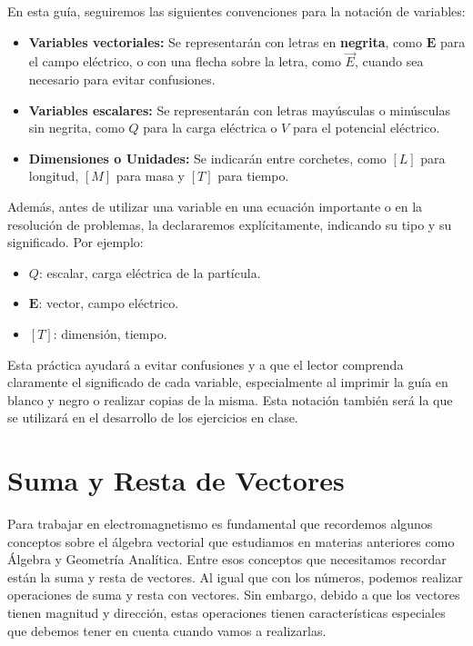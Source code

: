 \documentclass{book}
\begin{document}
En esta guía, seguiremos las siguientes convenciones para la notación de variables:

\begin{itemize}
    \item[\textbullet] \textbf{Variables vectoriales:} Se representarán con letras en \textbf{negrita}, como $\mathbf{E}$ para el campo eléctrico, o con una flecha sobre la letra, como $\vec{E}$, cuando sea necesario para evitar confusiones.
    \item[\textbullet] \textbf{Variables escalares:} Se representarán con letras mayúsculas o minúsculas sin negrita, como $Q$ para la carga eléctrica o $V$ para el potencial eléctrico.
    \item[\textbullet] \textbf{Dimensiones o Unidades:} Se indicarán entre corchetes, como $[L]$ para longitud, $[M]$ para masa y $[T]$ para tiempo.
\end{itemize}
Además, antes de utilizar una variable en una ecuación importante o en la resolución de problemas, la declararemos explícitamente, indicando su tipo y su significado. Por ejemplo:

\begin{itemize}
    \item[\textbullet] $Q$: escalar, carga eléctrica de la partícula.
    \item[\textbullet] $\mathbf{E}$: vector, campo eléctrico.
    \item[\textbullet] $[T]$: dimensión, tiempo.
\end{itemize}

Esta práctica ayudará a evitar confusiones y a que el lector comprenda claramente el significado de cada variable, especialmente al imprimir la guía en blanco y negro o realizar copias de la misma. Esta notación también será la que se utilizará en el desarrollo de los ejercicios en clase.

\section{Suma y Resta de Vectores}

Para trabajar en electromagnetismo es fundamental que recordemos algunos conceptos sobre el álgebra vectorial que estudiamos en materias anteriores como Álgebra y Geometría Analítica. Entre esos conceptos que necesitamos recordar están la suma y resta de vectores. Al igual que con los números, podemos realizar operaciones de suma y resta con vectores. Sin embargo, debido a que los vectores tienen magnitud y dirección, estas operaciones tienen características especiales que debemos tener en cuenta cuando vamos a realizarlas.
\end{document}
